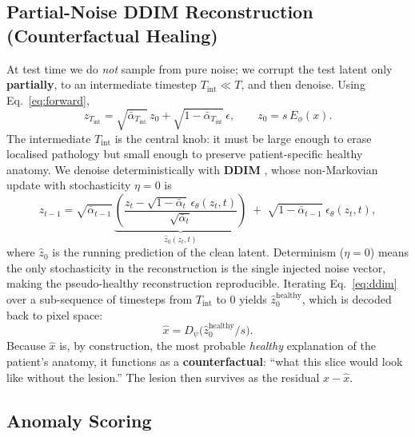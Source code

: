 \documentclass[12pt, a4paper]{article}
\begin{document}
\subsection{Partial-Noise DDIM Reconstruction (Counterfactual Healing)}
At test time we do \emph{not} sample from pure noise; we corrupt the test latent only \textbf{partially}, to an intermediate timestep $T_{\text{int}}\ll T$, and then denoise. Using Eq.~\eqref{eq:forward},
\begin{equation}
    z_{T_{\text{int}}} = \sqrt{\bar{\alpha}_{T_{\text{int}}}}\,z_0 + \sqrt{1-\bar{\alpha}_{T_{\text{int}}}}\,\epsilon,
    \qquad z_0 = s\,E_\phi(x).
\end{equation}
The intermediate $T_{\text{int}}$ is the central knob: it must be large enough to erase localised pathology but small enough to preserve patient-specific healthy anatomy. We denoise deterministically with \textbf{DDIM} \cite{song2021}, whose non-Markovian update with stochasticity $\eta=0$ is
\begin{equation}
    z_{t-1} = \sqrt{\bar{\alpha}_{t-1}}\,\underbrace{\left(\frac{z_t - \sqrt{1-\bar{\alpha}_t}\,\epsilon_\theta(z_t,t)}{\sqrt{\bar{\alpha}_t}}\right)}_{\hat{z}_0(z_t,t)} \;+\; \sqrt{1-\bar{\alpha}_{t-1}}\;\epsilon_\theta(z_t,t),
    \label{eq:ddim}
\end{equation}
where $\hat{z}_0$ is the running prediction of the clean latent. Determinism ($\eta=0$) means the only stochasticity in the reconstruction is the single injected noise vector, making the pseudo-healthy reconstruction reproducible. Iterating Eq.~\eqref{eq:ddim} over a sub-sequence of timesteps from $T_{\text{int}}$ to $0$ yields $\hat{z}_0^{\text{healthy}}$, which is decoded back to pixel space:
\begin{equation}
    \hat{x} = D_\psi\!\big(\hat{z}_0^{\text{healthy}} / s\big).
\end{equation}
Because $\hat{x}$ is, by construction, the most probable \emph{healthy} explanation of the patient's anatomy, it functions as a \textbf{counterfactual}: ``what this slice would look like without the lesion.'' The lesion then survives as the residual $x - \hat{x}$.

\subsection{Anomaly Scoring}
\end{document}
